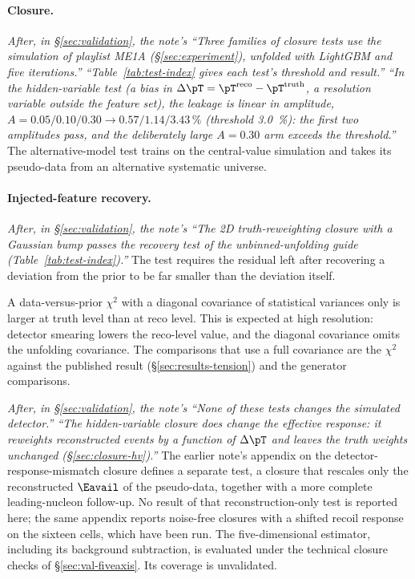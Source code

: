 \paragraph{Closure.}
\emph{After, in \S\ref{sec:validation}, the note's ``Three families of closure tests use the simulation of playlist ME1A (\S\ref{sec:experiment}), unfolded with LightGBM and five iterations.'' ``Table~\ref{tab:test-index} gives each test's threshold and result.'' ``In the hidden-variable test (a bias in $\Delta\pT=\pT^{\mathrm{reco}}-\pT^{\mathrm{truth}}$, a resolution variable outside the feature set), the leakage is linear in amplitude, $A=0.05/0.10/0.30\to0.57/1.14/3.43\,\%$ (threshold \SI{3.0}{\percent}): the first two amplitudes pass, and the deliberately large $A=0.30$ arm exceeds the threshold.''}
The alternative-model test trains on the central-value simulation and takes its pseudo-data from an alternative systematic universe.

\paragraph{Injected-feature recovery.}
\emph{After, in \S\ref{sec:validation}, the note's ``The 2D truth-reweighting closure with a Gaussian bump passes the recovery test of the unbinned-unfolding guide~\cite{Canelli:2025guide} (Table~\ref{tab:test-index}).''}
The test requires the residual left after recovering a deviation from the prior to be far smaller than the deviation itself.

A data-versus-prior $\chi^2$ with a diagonal covariance of statistical variances only is larger at truth level than at reco level. This is expected at high resolution: detector smearing lowers the reco-level value, and the diagonal covariance omits the unfolding covariance. The comparisons that use a full covariance are the $\chi^2$ against the published result (\S\ref{sec:results-tension}) and the generator comparisons.

\emph{After, in \S\ref{sec:validation}, the note's ``None of these tests changes the simulated detector.'' ``The hidden-variable closure does change the effective response: it reweights reconstructed events by a function of $\Delta\pT$ and leaves the truth weights unchanged (\S\ref{sec:closure-hv}).''}
The earlier note's appendix on the detector-response-mismatch closure defines a separate test, a closure that rescales only the reconstructed $\Eavail$ of the pseudo-data, together with a more complete leading-nucleon follow-up. No result of that reconstruction-only test is reported here; the same appendix reports noise-free closures with a shifted recoil response on the sixteen cells, which have been run. The five-dimensional estimator, including its background subtraction, is evaluated under the technical closure checks of \S\ref{sec:val-fiveaxis}. Its coverage is unvalidated.

